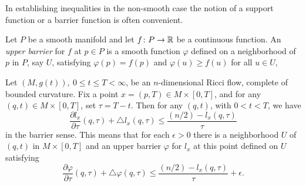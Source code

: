 In establishing inequalities in the non-smooth case the notion of a
support function or a barrier function is often convenient.

\begin{definition}
\label{def:upper-barrier}
Let $P$ be a smooth manifold and let $f\colon P\to \mathbb{R}$ be a continuous
function. An {\em upper barrier} for $f$ at $p\in P$ is a
smooth function $\varphi$ defined on a neighborhood of $p$ in $P$, say $U$,
satisfying $\varphi(p)=f(p)$ and $\varphi(u)\ge f(u)$ for all $u\in U$, 
\end{definition}





\begin{proposition}
\label{prop:l-barrier-inequality}
\label{weaksense}
Let $(M,g(t)),\ 0\le t\le T<\infty$, be an $n$-dimensional Ricci
flow,  complete  of bounded curvature. Fix a point $x=(p,T)\in
M\times [0,T]$, and for any $(q,t)\in M\times [0,T]$, set
$\tau=T-t$. Then for any $(q,t)$, with $0<t<T$, we have
$$\frac{\partial l_x}{\partial \tau}(q,\tau) +\triangle l_x(q,\tau)\le
\frac{(n/2)-l_x(q,\tau)}{\tau}$$ in the barrier sense. This means
that
 for each $\epsilon>0$ there is a neighborhood $U$ of $(q,t)$ in
 $M\times [0,T]$
 and an upper barrier $\varphi$ for $l_x$ at this point defined on $U$
satisfying
$$\frac{\partial \varphi}{\partial \tau}(q,\tau)+\triangle \varphi(q,\tau)
\le \frac{(n/2)-l_x(q,\tau)}{\tau}+\epsilon.$$
\end{proposition}

